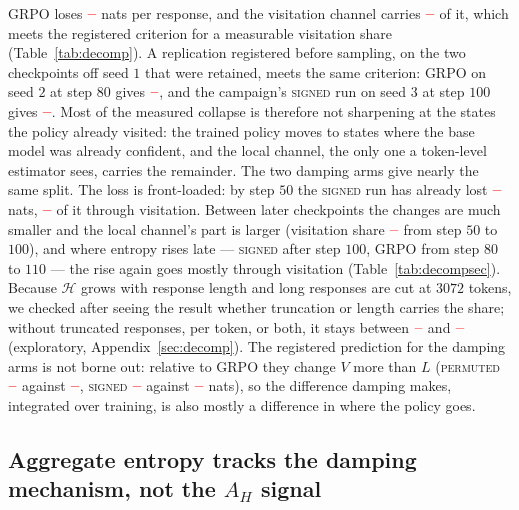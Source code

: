 \documentclass[11pt]{article}
\newcommand{\Htraj}{\mathcal{H}}
\newcommand{\AH}{A_{H}}
\providecommand{\PENDING}{\textcolor{red}{\textbf{--}}}
\newcommand{\num}[1]{\ifcsname #1\endcsname\csname #1\endcsname\else\PENDING\fi}
\begin{document}
GRPO loses $\num{DecGrpoDH}$ nats per response, and the visitation channel carries
$\num{DecGrpoShare}$ of it, which meets the registered criterion for a measurable
visitation share (Table~\ref{tab:decomp}). A replication registered before sampling,
on the two checkpoints off seed $1$ that were retained, meets the same criterion:
GRPO on seed $2$ at step $80$ gives $\num{DecRepGrpoShare}$, and the campaign's
\textsc{signed} run on seed $3$ at step $100$ gives $\num{DecRepSignedShare}$. Most of the measured collapse is therefore
not sharpening at the states the policy already visited: the trained policy moves to
states where the base model was already confident, and the local channel, the only
one a token-level estimator sees, carries the remainder. The two damping arms give
nearly the same split. The loss is front-loaded: by step $50$ the \textsc{signed} run
has already lost $\num{DecSecSignedADH}$ nats, $\num{DecSecSignedAShare}$ of it through
visitation. Between later checkpoints the changes are much smaller and the local
channel's part is larger (visitation share $\num{DecSecSignedBShare}$ from step $50$
to $100$), and where entropy rises late --- \textsc{signed} after step $100$, GRPO from
step $80$ to $110$ --- the rise again goes mostly through visitation
(Table~\ref{tab:decompsec}). Because $\Htraj$ grows with response length and long responses
are cut at $3072$ tokens, we checked after seeing the result whether truncation or
length carries the share; without truncated responses, per token, or both, it stays
between $\num{DecRobustMin}$ and $\num{DecRobustMax}$ (exploratory,
Appendix~\ref{sec:decomp}). The registered prediction for the damping arms is not
borne out: relative to GRPO they change $V$ more than $L$ (\textsc{permuted}
$\num{DecPermdV}$ against $\num{DecPermdL}$, \textsc{signed} $\num{DecSigneddV}$
against $\num{DecSigneddL}$ nats), so the difference damping makes, integrated over
training, is also mostly a difference in where the policy goes.

\subsection{Aggregate entropy tracks the damping mechanism, not the $\AH$ signal}
\label{sec:res:entropy}
\end{document}
